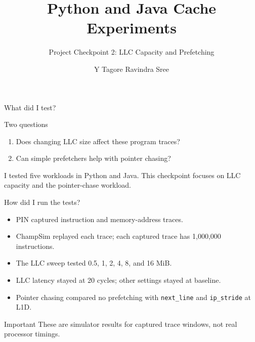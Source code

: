 \documentclass[aspectratio=169]{beamer}
\title{Python and Java Cache Experiments}
\subtitle{Project Checkpoint 2: LLC Capacity and Prefetching}
\author{Y Tagore Ravindra Sree}
\institute{CS683 Project}
\date{}
\begin{document}
\begin{frame}
  \titlepage
\end{frame}

\begin{frame}{What did I test?}
  \begin{block}{Two questions}
    \begin{enumerate}
      \item Does changing LLC size affect these program traces?
      \item Can simple prefetchers help with pointer chasing?
    \end{enumerate}
  \end{block}

  \vspace{0.4em}
  I tested five workloads in Python and Java. This checkpoint focuses on
  LLC capacity and the pointer-chase workload.
\end{frame}

\begin{frame}{How did I run the tests?}
  \begin{itemize}
    \item PIN captured instruction and memory-address traces.
    \item ChampSim replayed each trace; each captured trace has 1,000,000 instructions.
    \item The LLC sweep tested 0.5, 1, 2, 4, 8, and 16 MiB.
    \item LLC latency stayed at 20 cycles; other settings stayed at baseline.
    \item Pointer chasing compared no prefetching with \texttt{next\_line}
          and \texttt{ip\_stride} at L1D.
  \end{itemize}

  \begin{alertblock}{Important}
    These are simulator results for captured trace windows, not real
    processor timings.
  \end{alertblock}
\end{frame}
\end{document}
